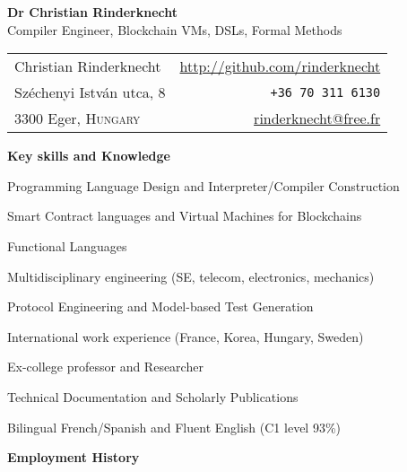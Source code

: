\documentclass[a4paper,11pt]{article}
\begin{document}
\begin{center}
\textbf{\LARGE Dr Christian Rinderknecht}\\[5mm]
       {\large Compiler Engineer, Blockchain VMs, DSLs, Formal Methods}
\end{center}

\noindent
\begin{tabular}{@{}l@{\qquad\qquad\qquad\qquad}r@{}}
  Christian Rinderknecht
& \url{http://github.com/rinderknecht}\\
  Széchenyi István utca, 8
& \texttt{+36 70 311 6130}\\
  3300 Eger, \textsc{Hungary}
& \url{rinderknecht@free.fr}
\end{tabular}

\medskip


\pagestyle{empty}

\bigskip
\noindent\textbf{\large Key skills and Knowledge}
\begin{itemize*}

  \item Programming Language Design and Interpreter/Compiler Construction

  \item Smart Contract languages and Virtual Machines for Blockchains

  \item Functional Languages

  \item Multidisciplinary engineering (SE, telecom, electronics, mechanics)

  \item Protocol Engineering and Model-based Test Generation

  \item International work experience (France, Korea, Hungary, Sweden)

  \item Ex-college professor and Researcher

  \item Technical Documentation and Scholarly Publications

  \item Bilingual French/Spanish and Fluent English (C1 level 93\%)

\end{itemize*}

\smallskip
\noindent\textbf{\large Employment History}
\bigskip
\end{document}
